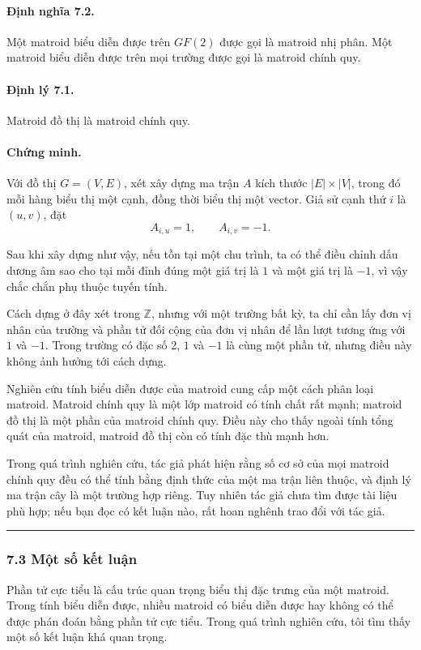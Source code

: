\documentclass[11pt]{article}
\newcommand{\qedmark}{\hfill\rule{0.7ex}{0.7ex}}
\begin{document}
\paragraph{Định nghĩa 7.2.}
Một matroid biểu diễn được trên \(GF(2)\) được gọi là matroid nhị phân. Một
matroid biểu diễn được trên mọi trường được gọi là matroid chính quy.

\paragraph{Định lý 7.1.}
Matroid đồ thị là matroid chính quy.

\paragraph{Chứng minh.}
Với đồ thị \(G=(V,E)\), xét xây dựng ma trận \(A\) kích thước \(|E|\times |V|\),
trong đó mỗi hàng biểu thị một cạnh, đồng thời biểu thị một vector. Giả sử cạnh
thứ \(i\) là \((u,v)\), đặt
\[
  A_{i,u}=1,\qquad A_{i,v}=-1.
\]

Sau khi xây dựng như vậy, nếu tồn tại một chu trình, ta có thể điều chỉnh dấu
dương âm sao cho tại mỗi đỉnh đúng một giá trị là \(1\) và một giá trị là
\(-1\), vì vậy chắc chắn phụ thuộc tuyến tính.

Cách dựng ở đây xét trong \(\mathbb Z\), nhưng với một trường bất kỳ, ta chỉ cần
lấy đơn vị nhân của trường và phần tử đối cộng của đơn vị nhân để lần lượt tương
ứng với \(1\) và \(-1\). Trong trường có đặc số 2, \(1\) và \(-1\) là cùng một
phần tử, nhưng điều này không ảnh hưởng tới cách dựng.

Nghiên cứu tính biểu diễn được của matroid cung cấp một cách phân loại matroid.
Matroid chính quy là một lớp matroid có tính chất rất mạnh; matroid đồ thị là
một phần của matroid chính quy. Điều này cho thấy ngoài tính tổng quát của
matroid, matroid đồ thị còn có tính đặc thù mạnh hơn.

Trong quá trình nghiên cứu, tác giả phát hiện rằng số cơ sở của mọi matroid
chính quy đều có thể tính bằng định thức của một ma trận liên thuộc, và định lý
ma trận cây là một trường hợp riêng. Tuy nhiên tác giả chưa tìm được tài liệu
phù hợp; nếu bạn đọc có kết luận nào, rất hoan nghênh trao đổi với tác giả.
\qedmark

\subsubsection*{7.3 Một số kết luận}

Phần tử cực tiểu là cấu trúc quan trọng biểu thị đặc trưng của một matroid.
Trong tính biểu diễn được, nhiều matroid có biểu diễn được hay không có thể được
phán đoán bằng phần tử cực tiểu. Trong quá trình nghiên cứu, tôi tìm thấy một số
kết luận khá quan trọng.
\end{document}
